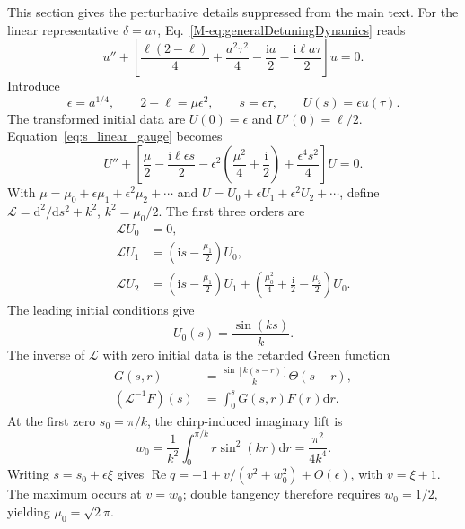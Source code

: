 \documentclass[reprint,superscriptaddress,floatfix,amsmath,amssymb,prresearch,aps]{revtex4-2}
\newcommand{\dd}{\mathrm{d}}
\newcommand{\ii}{\mathrm{i}}
\newcommand{\Ree}{\operatorname{Re}}
\begin{document}
This section gives the perturbative details suppressed from the main text.
For the linear representative \(\delta=a\tau\),
Eq.~\eqref{M-eq:generalDetuningDynamics} reads
\begin{equation}
u''+\left[
\frac{\ell(2-\ell)}4+\frac{a^2\tau^2}{4}
-\frac{\ii a}{2}-\frac{\ii\ell a\tau}{2}
\right]u=0.
\label{eq:s_linear_gauge}
\end{equation}
Introduce
\begin{equation}
\epsilon=a^{1/4},\qquad
2-\ell=\mu\epsilon^2,\qquad
s=\epsilon\tau,\qquad
U(s)=\epsilon u(\tau).
\label{eq:s_critical_scaling}
\end{equation}
The transformed initial data are \(U(0)=\epsilon\) and
\(U'(0)=\ell/2\). Equation~\eqref{eq:s_linear_gauge} becomes
\begin{equation}
U''+\left[
\frac{\mu}{2}-\frac{\ii\ell\epsilon s}{2}
-\epsilon^2\left(\frac{\mu^2}{4}+\frac{\ii}{2}\right)
+\frac{\epsilon^4s^2}{4}
\right]U=0.
\label{eq:s_scaled_critical}
\end{equation}
With
\(\mu=\mu_0+\epsilon\mu_1+\epsilon^2\mu_2+\cdots\) and
\(U=U_0+\epsilon U_1+\epsilon^2U_2+\cdots\), define
\(\mathcal L=\dd^2/\dd s^2+k^2\), \(k^2=\mu_0/2\). The first three
orders are
\begin{align}
\mathcal L U_0&=0,
\label{eq:U0hierarchy}\\
\mathcal L U_1&=\left(\ii s-\frac{\mu_1}{2}\right)U_0,
\label{eq:U1hierarchy}\\
\mathcal L U_2&=\left(\ii s-\frac{\mu_1}{2}\right)U_1
+\left(\frac{\mu_0^2}{4}+\frac{\ii}{2}
-\frac{\mu_2}{2}\right)U_0.
\label{eq:U2hierarchy}
\end{align}
The leading initial conditions give
\begin{equation}
U_0(s)=\frac{\sin(ks)}{k}.
\label{eq:Uzero}
\end{equation}
The inverse of \(\mathcal L\) with zero initial data is the retarded Green
function
\begin{equation}
\begin{aligned}
G(s,r)&=\frac{\sin[k(s-r)]}{k}\Theta(s-r),\\
(\mathcal L^{-1}F)(s)&=\int_0^sG(s,r)F(r)\dd r.
\end{aligned}
\label{eq:criticalGreenfunction}
\end{equation}
At the first zero \(s_0=\pi/k\), the chirp-induced imaginary lift is
\begin{equation}
w_0=\frac1{k^2}\int_0^{\pi/k}r\sin^2(kr)\dd r
=\frac{\pi^2}{4k^4}.
\label{eq:s_wzero}
\end{equation}
Writing \(s=s_0+\epsilon\xi\) gives
\(\Ree q=-1+v/(v^2+w_0^2)+O(\epsilon)\), with \(v=\xi+1\).
The maximum occurs at \(v=w_0\); double tangency therefore requires
\(w_0=1/2\), yielding \(\mu_0=\sqrt2\pi\).
\end{document}

